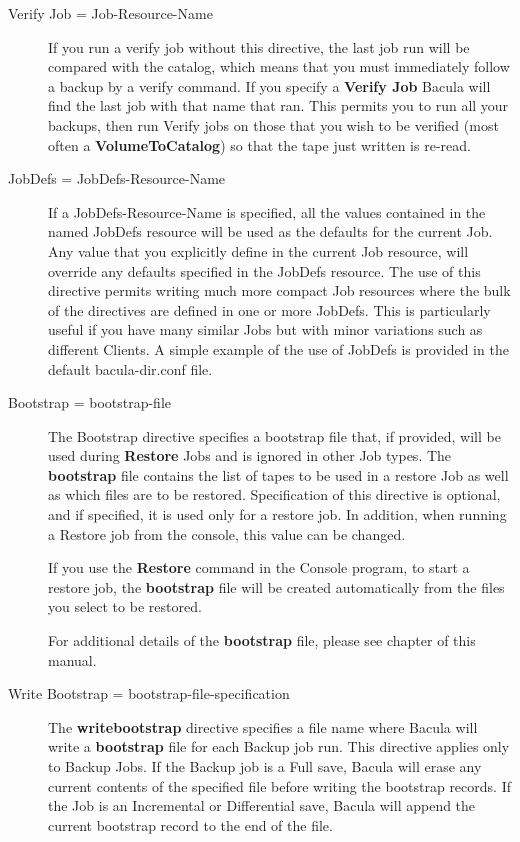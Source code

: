 \begin{description}
\item [Verify Job = \lt{}Job-Resource-Name\gt{}]
   If you run a verify job without this directive, the last job run will be
   compared with the catalog, which means that you must immediately follow
   a backup by a verify command.  If you specify a {\bf Verify Job} Bacula
   will find the last job with that name that ran.  This permits you to run
   all your backups, then run Verify jobs on those that you wish to be
   verified (most often a {\bf VolumeToCatalog}) so that the tape just
   written is re-read.

\item [JobDefs = \lt{}JobDefs-Resource-Name\gt{}]
   If a JobDefs-Resource-Name is specified, all the values contained in the
   named JobDefs resource will be used as the defaults for the current Job.
   Any value that you explicitly define in the current Job resource, will
   override any defaults specified in the JobDefs resource.  The use of
   this directive permits writing much more compact Job resources where the
   bulk of the directives are defined in one or more JobDefs.  This is
   particularly useful if you have many similar Jobs but with minor
   variations such as different Clients.  A simple example of the use of
   JobDefs is provided in the default bacula-dir.conf file.

\item [Bootstrap = \lt{}bootstrap-file\gt{}]
   The Bootstrap directive specifies a bootstrap file that, if provided,
   will be used during {\bf Restore} Jobs and is ignored in other Job
   types.  The {\bf bootstrap} file contains the list of tapes to be used
   in a restore Job as well as which files are to be restored.
   Specification of this directive is optional, and if specified, it is
   used only for a restore job.  In addition, when running a Restore job
   from the console, this value can be changed.

   If you use the {\bf Restore} command in the Console program, to start a
   restore job, the {\bf bootstrap} file will be created automatically from
   the files you select to be restored.

   For additional details of the {\bf bootstrap} file, please see
    chapter
   of this manual.

\label{writebootstrap}
\item [Write Bootstrap =  \lt{}bootstrap-file-specification\gt{}]
   The {\bf writebootstrap} directive specifies a file name where Bacula
   will write a {\bf bootstrap} file for each Backup job run.  This
   directive applies only to Backup Jobs.  If the Backup job is a Full
   save, Bacula will erase any current contents of the specified file
   before writing the bootstrap records.  If the Job is an Incremental
   or Differential
   save, Bacula will append the current bootstrap record to the end of the
   file.


\end{description}
